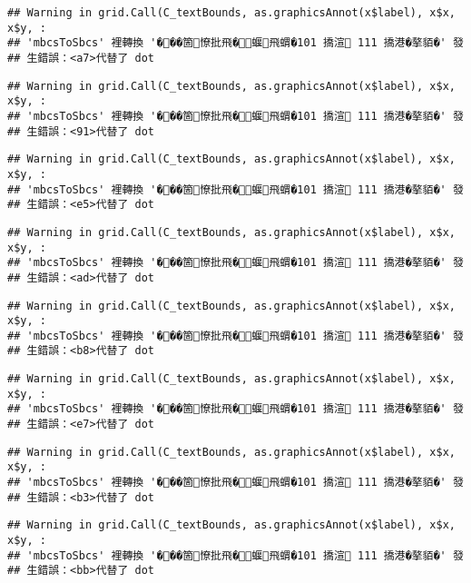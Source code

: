 \documentclass[
]{article}
\begin{document}
\begin{verbatim}
## Warning in grid.Call(C_textBounds, as.graphicsAnnot(x$label), x$x, x$y, :
## 'mbcsToSbcs' 裡轉換 '���箇憭批飛�蝘飛蝟�101 撟渲 111 撟港�摮貊�' 發
## 生錯誤：<a7>代替了 dot
\end{verbatim}

\begin{verbatim}
## Warning in grid.Call(C_textBounds, as.graphicsAnnot(x$label), x$x, x$y, :
## 'mbcsToSbcs' 裡轉換 '���箇憭批飛�蝘飛蝟�101 撟渲 111 撟港�摮貊�' 發
## 生錯誤：<91>代替了 dot
\end{verbatim}

\begin{verbatim}
## Warning in grid.Call(C_textBounds, as.graphicsAnnot(x$label), x$x, x$y, :
## 'mbcsToSbcs' 裡轉換 '���箇憭批飛�蝘飛蝟�101 撟渲 111 撟港�摮貊�' 發
## 生錯誤：<e5>代替了 dot
\end{verbatim}

\begin{verbatim}
## Warning in grid.Call(C_textBounds, as.graphicsAnnot(x$label), x$x, x$y, :
## 'mbcsToSbcs' 裡轉換 '���箇憭批飛�蝘飛蝟�101 撟渲 111 撟港�摮貊�' 發
## 生錯誤：<ad>代替了 dot
\end{verbatim}

\begin{verbatim}
## Warning in grid.Call(C_textBounds, as.graphicsAnnot(x$label), x$x, x$y, :
## 'mbcsToSbcs' 裡轉換 '���箇憭批飛�蝘飛蝟�101 撟渲 111 撟港�摮貊�' 發
## 生錯誤：<b8>代替了 dot
\end{verbatim}

\begin{verbatim}
## Warning in grid.Call(C_textBounds, as.graphicsAnnot(x$label), x$x, x$y, :
## 'mbcsToSbcs' 裡轉換 '���箇憭批飛�蝘飛蝟�101 撟渲 111 撟港�摮貊�' 發
## 生錯誤：<e7>代替了 dot
\end{verbatim}

\begin{verbatim}
## Warning in grid.Call(C_textBounds, as.graphicsAnnot(x$label), x$x, x$y, :
## 'mbcsToSbcs' 裡轉換 '���箇憭批飛�蝘飛蝟�101 撟渲 111 撟港�摮貊�' 發
## 生錯誤：<b3>代替了 dot
\end{verbatim}

\begin{verbatim}
## Warning in grid.Call(C_textBounds, as.graphicsAnnot(x$label), x$x, x$y, :
## 'mbcsToSbcs' 裡轉換 '���箇憭批飛�蝘飛蝟�101 撟渲 111 撟港�摮貊�' 發
## 生錯誤：<bb>代替了 dot
\end{verbatim}
\end{document}
